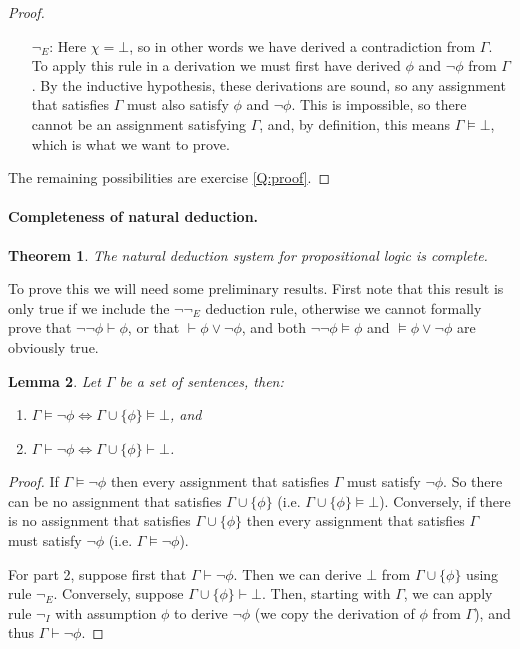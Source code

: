 \documentclass{article}
\theoremstyle{plain}
\newtheorem{theorem}{Theorem}[section]{\bfseries}{\itshape}
\newtheorem{lemma}[theorem]{Lemma}{\bfseries}{\upshape}
\begin{document}
\begin{proof}
\begin{itemize}
\item[$\neg_E$:] Here $\chi =\bot$, so in other words we have derived a contradiction from $\Gamma$. To apply this rule in a derivation we must first have derived $\phi$ and $\neg\phi$ from $\Gamma$. By the inductive hypothesis, these derivations are sound, so any assignment that satisfies $\Gamma$ must also satisfy $\phi$ and $\neg\phi$. This is impossible, so there cannot be an assignment satisfying $\Gamma$, and, by definition, this means $\Gamma\models\bot$, which is what we want to prove. 
\end{itemize}
The remaining possibilities are exercise \ref{Q:proof}.      
\end{proof}

\paragraph{Completeness of natural deduction.}

\begin{theorem}\label{T:complete}
The natural deduction system for propositional logic is complete.
\end{theorem}

To prove this we will need some preliminary results. First note that this result is only true if we include the $\neg\neg_E$ deduction rule, otherwise we cannot formally prove that $\neg\neg\phi\vdash \phi$, or that $\vdash\phi\vee\neg\phi$, and both $\neg\neg\phi\models \phi$ and $\models\phi\vee\neg\phi$ are obviously true.

\begin{lemma}\label{L:equiv}
Let $\Gamma$ be a set of sentences, then:
\begin{enumerate}
\item $\Gamma\models \neg\phi\iff \Gamma\cup\{\phi\}\models\bot$, and
\item $\Gamma\vdash \neg\phi\iff \Gamma\cup\{\phi\}\vdash\bot$.
\end{enumerate}
\end{lemma}
\begin{proof}
If $\Gamma\models \neg\phi$ then every assignment that satisfies $\Gamma$ must satisfy $\neg\phi$. So there can be no assignment that satisfies $\Gamma\cup\{\phi\}$ (i.e. $\Gamma\cup\{\phi\}\models\bot$). Conversely, if there is no assignment that satisfies $\Gamma\cup\{\phi\}$ then every assignment that satisfies $\Gamma$ must satisfy $\neg\phi$ (i.e. $\Gamma\models \neg\phi$).

For part 2, suppose first that $\Gamma\vdash \neg\phi$. Then we can derive $\bot$ from $\Gamma\cup\{\phi\}$ using rule $\neg_E$. Conversely, suppose $\Gamma\cup\{\phi\}\vdash \bot$. Then, starting with $\Gamma$, we can apply rule $\neg_I$ with assumption $\phi$ to derive $\neg\phi$ (we copy the derivation of $\phi$ from $\Gamma$), and thus $\Gamma\vdash \neg\phi$. 
\end{proof}
\end{document}

